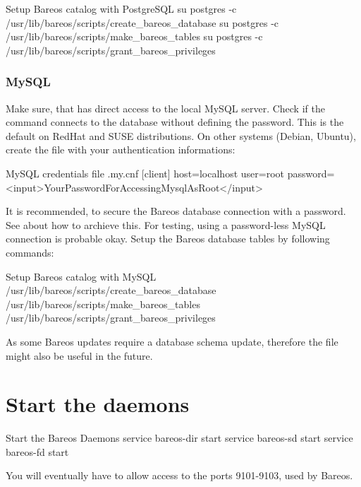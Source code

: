 \begin{commands}{Setup Bareos catalog with PostgreSQL}
su postgres -c /usr/lib/bareos/scripts/create_bareos_database
su postgres -c /usr/lib/bareos/scripts/make_bareos_tables
su postgres -c /usr/lib/bareos/scripts/grant_bareos_privileges
\end{commands}


\subsubsection{MySQL}
Make sure, that  has direct access to the local MySQL server. 
Check if the command  connects to the database without defining the password.
This is the default on RedHat and SUSE distributions. 
On other systems (Debian, Ubuntu),
create the file  with your authentication informations:

\begin{config}{MySQL credentials file .my.cnf}
[client]
host=localhost
user=root
password=<input>YourPasswordForAccessingMysqlAsRoot</input>
\end{config}

It is recommended, to secure the Bareos database connection with a password.
See  about how to archieve this.
For testing, using a password-less MySQL connection is probable okay.
Setup the Bareos database tables by following commands:
\begin{commands}{Setup Bareos catalog with MySQL}
/usr/lib/bareos/scripts/create_bareos_database
/usr/lib/bareos/scripts/make_bareos_tables
/usr/lib/bareos/scripts/grant_bareos_privileges
\end{commands}

As some Bareos updates require a database schema update,
therefore the file  might also be useful in the future.


\section{Start the daemons}
    \label{sec:StartDaemons}

\begin{commands}{Start the Bareos Daemons}
service bareos-dir start
service bareos-sd start
service bareos-fd start
\end{commands}

You will eventually have to allow access to the ports 9101-9103, used by Bareos.

